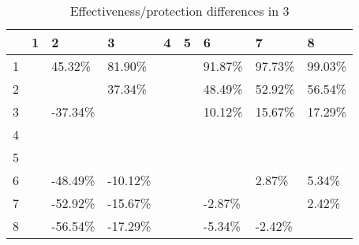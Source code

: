 \begin{table}[ht]
\centering
\begin{tabular}{rllllllll}
  \hline
 & 1 & 2 & 3 & 4 & 5 & 6 & 7 & 8 \\ 
  \hline
1 &  & 45.32\% & 81.90\% &  &  & 91.87\% & 97.73\% & 99.03\% \\ 
  2 &  &  & 37.34\% &  &  & 48.49\% & 52.92\% & 56.54\% \\ 
  3 &  & -37.34\% &  &  &  & 10.12\% & 15.67\% & 17.29\% \\ 
  4 &  &  &  &  &  &  &  &  \\ 
  5 &  &  &  &  &  &  &  &  \\ 
  6 &  & -48.49\% & -10.12\% &  &  &  & 2.87\% & 5.34\% \\ 
  7 &  & -52.92\% & -15.67\% &  &  & -2.87\% &  & 2.42\% \\ 
  8 &  & -56.54\% & -17.29\% &  &  & -5.34\% & -2.42\% &  \\ 
   \hline
\end{tabular}
\caption{Effectiveness/protection differences in  3} 
\end{table}
